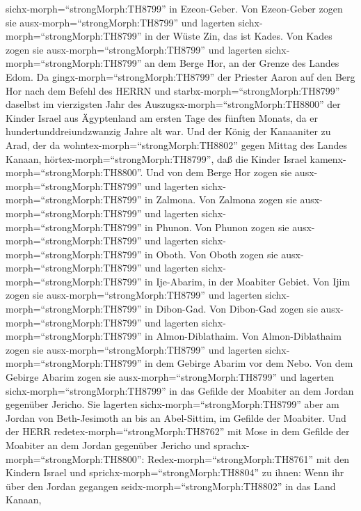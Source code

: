 sichx-morph=``strongMorph:TH8799'' in Ezeon-Geber.  Von
Ezeon-Geber zogen sie ausx-morph=``strongMorph:TH8799'' und lagerten
sichx-morph=``strongMorph:TH8799'' in der Wüste Zin, das ist Kades.
 Von Kades zogen sie ausx-morph=``strongMorph:TH8799'' und
lagerten sichx-morph=``strongMorph:TH8799'' an dem Berge Hor, an der
Grenze des Landes Edom.  Da
gingx-morph=``strongMorph:TH8799'' der Priester Aaron auf den Berg Hor
nach dem Befehl des HERRN und starbx-morph=``strongMorph:TH8799''
daselbst im vierzigsten Jahr des Auszugsx-morph=``strongMorph:TH8800''
der Kinder Israel aus Ägyptenland am ersten Tage des fünften Monats,
 da er hundertunddreiundzwanzig Jahre alt war.
 Und der König der Kanaaniter zu Arad, der da
wohntex-morph=``strongMorph:TH8802'' gegen Mittag des Landes Kanaan,
hörtex-morph=``strongMorph:TH8799'', daß die Kinder Israel
kamenx-morph=``strongMorph:TH8800''.  Und von dem Berge Hor
zogen sie ausx-morph=``strongMorph:TH8799'' und lagerten
sichx-morph=``strongMorph:TH8799'' in Zalmona.  Von Zalmona
zogen sie ausx-morph=``strongMorph:TH8799'' und lagerten
sichx-morph=``strongMorph:TH8799'' in Phunon.  Von Phunon
zogen sie ausx-morph=``strongMorph:TH8799'' und lagerten
sichx-morph=``strongMorph:TH8799'' in Oboth.  Von Oboth
zogen sie ausx-morph=``strongMorph:TH8799'' und lagerten
sichx-morph=``strongMorph:TH8799'' in Ije-Abarim, in der Moabiter
Gebiet.  Von Ijim zogen sie
ausx-morph=``strongMorph:TH8799'' und lagerten
sichx-morph=``strongMorph:TH8799'' in Dibon-Gad.  Von
Dibon-Gad zogen sie ausx-morph=``strongMorph:TH8799'' und lagerten
sichx-morph=``strongMorph:TH8799'' in Almon-Diblathaim. 
Von Almon-Diblathaim zogen sie ausx-morph=``strongMorph:TH8799'' und
lagerten sichx-morph=``strongMorph:TH8799'' in dem Gebirge Abarim vor
dem Nebo.  Von dem Gebirge Abarim zogen sie
ausx-morph=``strongMorph:TH8799'' und lagerten
sichx-morph=``strongMorph:TH8799'' in das Gefilde der Moabiter an dem
Jordan gegenüber Jericho.  Sie lagerten
sichx-morph=``strongMorph:TH8799'' aber am Jordan von Beth-Jesimoth an
bis an Abel-Sittim, im Gefilde der Moabiter.  Und der HERR
redetex-morph=``strongMorph:TH8762'' mit Mose in dem Gefilde der
Moabiter an dem Jordan gegenüber Jericho und
sprachx-morph=``strongMorph:TH8800'': 
Redex-morph=``strongMorph:TH8761'' mit den Kindern Israel und
sprichx-morph=``strongMorph:TH8804'' zu ihnen: Wenn ihr über den Jordan
gegangen seidx-morph=``strongMorph:TH8802'' in das Land Kanaan,
